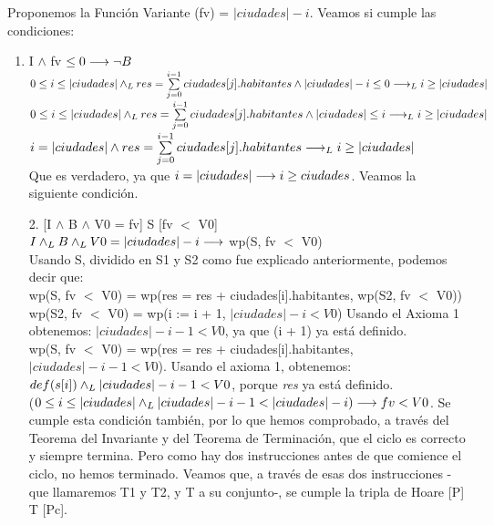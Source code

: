 \documentclass[10pt,a4paper]{article}
\begin{document}
    Proponemos la Función Variante (fv) = $|ciudades| - i$. Veamos si cumple las condiciones:\\
\begin{enumerate} \setlength\itemsep{0cm}
    \item I $\wedge$ fv $\leq 0  \longrightarrow \neg B$\\

    $0 \leq i \leq |ciudades| \land _L res = \sum\limits_{j=0}^{i - 1}ciudades[j].habitantes \wedge |ciudades| - i \leq 0 \longrightarrow _L i \geq |ciudades|$ \\
    
    $0 \leq i \leq |ciudades| \land _L res = \sum\limits_{j=0}^{i - 1}ciudades[j].habitantes \wedge |ciudades| \leq i \longrightarrow _L i \geq |ciudades|$ \\

    $i = |ciudades| \wedge  res = \sum\limits_{j=0}^{i - 1}ciudades[j].habitantes \longrightarrow _L i \geq |ciudades|$\\

    Que es verdadero, ya que $i = |ciudades| \longrightarrow i \geq ciudades$. Veamos la siguiente condición.\\

    \item[2.][I $\wedge$ B $\wedge$ V0 = fv] S [fv $<$ V0]\\

    $I \land _L B \land _L V0 = |ciudades| - i \longrightarrow$ wp(S, fv $<$ V0)\\
    
    Usando S, dividido en S1 y S2 como fue explicado anteriormente, podemos decir que:\\
    
    wp(S, fv $<$ V0) = wp(res = res + ciudades[i].habitantes, wp(S2, fv $<$ V0))\\

    wp(S2, fv $<$ V0) = wp(i := i + 1, $|ciudades| - i < V0$) Usando el Axioma 1 obtenemos: $|ciudades| - i - 1 < V0$, ya que (i + 1) ya está definido.\\

    wp(S, fv $<$ V0) = wp(res = res + ciudades[i].habitantes, $|ciudades| - i - 1 < V0$). Usando el axioma 1, obtenemos: $def (s[i]) \land _L |ciudades| - i - 1 < V0$, porque \textit{res} ya está definido.\\

    ($0\leq i \leq |ciudades| \land _L |ciudades| - i - 1 < |ciudades| - i) \longrightarrow fv < V0$. Se cumple esta condición también, por lo que hemos comprobado, a través del Teorema del Invariante y del Teorema de Terminación, que el ciclo es correcto y siempre termina. Pero como hay dos instrucciones antes de que comience el ciclo, no hemos terminado. Veamos que, a través de esas dos instrucciones -que llamaremos T1 y T2, y T a su conjunto-, se cumple la tripla de Hoare [P] T [Pc]. \\


\end{enumerate}
\end{document}
